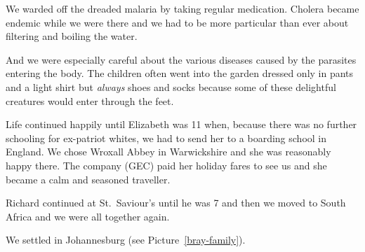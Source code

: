 
We warded off the dreaded malaria by taking regular
medication. Cholera became endemic while we were there and we had to
be more particular than ever about filtering and boiling the water.

And we were especially careful about the various diseases caused by
the parasites entering the body. The children often went into the
garden dressed only in pants and a light shirt but \textit{always}
shoes and socks because some of these delightful creatures would enter
through the feet.

Life continued happily until Elizabeth was 11 when, because there was
no further schooling for ex-patriot whites, we had to send her to a
boarding school in England. We chose Wroxall Abbey in Warwickshire and
she was reasonably happy there. The company (GEC) paid her holiday
fares to see us and she became a calm and seasoned traveller.

Richard continued at St.~Saviour's until he was 7 and then we moved to
South Africa and we were all together again.

We settled in Johannesburg (see Picture~\ref{bray-family}).

